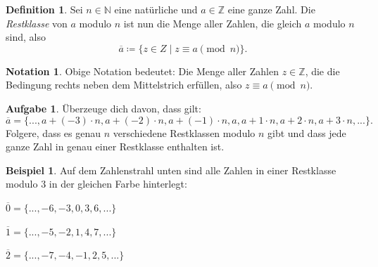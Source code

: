 \documentclass[a4paper,ngerman,12pt]{scrartcl}
\newcommand{\N}{\mathbb{N}}
\newcommand{\Z}{\mathbb{Z}}
\theoremstyle{definition}
\newtheorem{defn}{Definition}
\newtheorem*{aufg}{Aufgabe}
\newtheorem*{nota}{Notation}
\newtheorem*{bsp}{Beispiel}
\begin{document}
\begin{defn}
  Sei $n \in \N$ eine natürliche und $a \in \Z$ eine ganze Zahl.
  Die \emph{Restklasse} von $a$ modulo $n$ ist nun die Menge aller Zahlen, die gleich $a$ modulo $n$ sind, also
  \[ \overline{a} \coloneqq \{ z \in Z \mid z \equiv a \!\!\!\pmod{n} \}. \]
\end{defn}

\begin{shaded}
  \begin{nota}
    Obige Notation bedeutet: Die Menge aller Zahlen $z \in \Z$, die die Bedingung rechts neben dem Mittelstrich erfüllen, also $z \equiv a \pmod{n}$.
  \end{nota}
\end{shaded}

\begin{aufg}
  Überzeuge dich davon, dass gilt:
  \[ \overline{a} = \{ ..., a + (-3) \cdot n, a + (-2) \cdot n, a + (-1) \cdot n, a, a + 1 \cdot n, a + 2 \cdot n, a + 3 \cdot n, ... \}. \]
  Folgere, dass es genau $n$ verschiedene Restklassen modulo $n$ gibt und dass jede ganze Zahl in genau einer Restklasse enthalten ist.
\end{aufg}

\begin{bsp}
  Auf dem Zahlenstrahl unten sind alle Zahlen in einer Restklasse modulo $3$ in der gleichen Farbe hinterlegt:
  \begin{center}
  \begin{minipage}{0.3\linewidth}
    $\overline{0} = \{ ..., -6, -3, 0, 3, 6, ... \}$
  \end{minipage}
  \begin{minipage}{0.3\linewidth}
    $\overline{1} = \{ ..., -5, -2, 1, 4, 7, ... \}$
  \end{minipage}
  \begin{minipage}{0.3\linewidth}
    $\overline{2} = \{ ..., -7, -4, -1, 2, 5, ... \}$
  \end{minipage}
  \end{center}
\end{bsp}
\end{document}
